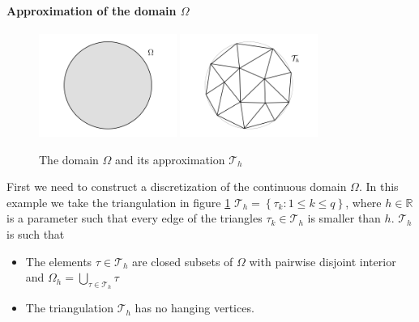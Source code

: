  \paragraph{Approximation of the domain $\Omega$}
\begin{figure}[h]
	\centering
	\includegraphics[width=0.4\textwidth]{figs/Chapter3/omega.png}
	\includegraphics[width=0.4\textwidth]{figs/Chapter3/mesh.png}
	\caption{\label{fig:omega and mesh}The domain $\Omega$ and its approximation $\mathcal T_h$}
\end{figure}
First we need to construct a discretization of the continuous domain $\Omega$. In this example we take the triangulation in figure \ref{fig:omega and mesh} $\mathcal T_h = \left\{\tau_{k} : 1 \leq k \leq q\right\}$, where $h\in\mathbb R$ is a parameter such that every edge of the triangles $\tau_k\in\mathcal T_h$ is smaller than $h$. $\mathcal T_h$ is such that 
\begin{itemize}
	\item The elements \(\tau \in \mathcal{T}_h\) are closed subsets of \(\Omega\) with pairwise disjoint interior and \({\Omega}_h=\bigcup_{\tau \in \mathcal{T}_h} \tau\)
	\item The triangulation \(\mathcal{T}_h\) has no hanging vertices.
\end{itemize}

